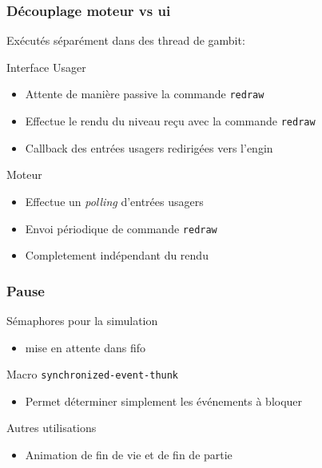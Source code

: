 \documentclass{beamer}
\newcommand{\<}[1]{\`#1}
\begin{document}
\begin{frame}
  \frametitle{Découplage moteur vs ui}

  Exécutés séparément dans des thread de gambit:
  \begin{block}{Interface Usager}
    \begin{itemize}
    \item Attente de manière passive la commande \texttt{redraw}
    \item Effectue le rendu du niveau reçu avec la commande
      \texttt{redraw}
    \item Callback des entrées usagers redirigées vers l'engin
    \end{itemize}
  \end{block}

  \begin{block}{Moteur}
    \begin{itemize}
    \item Effectue un \textit{polling} d'entrées usagers
    \item Envoi périodique de commande \texttt{redraw}
    \item Completement indépendant du rendu
    \end{itemize}
  \end{block}
\end{frame}

\begin{frame}
  \frametitle{Pause}

  \begin{block}{Sémaphores pour la simulation}
    \begin{itemize}
      \item mise en attente dans fifo
    \end{itemize}
  \end{block}

  \begin{block}{Macro \texttt{synchronized-event-thunk}}
    \begin{itemize}
      \item Permet déterminer simplement les événements à bloquer
    \end{itemize}
  \end{block}

  \begin{block}{Autres utilisations}
    \begin{itemize}
      \item Animation de fin de vie et de fin de partie
    \end{itemize}
  \end{block}
\end{frame}
\end{document}
